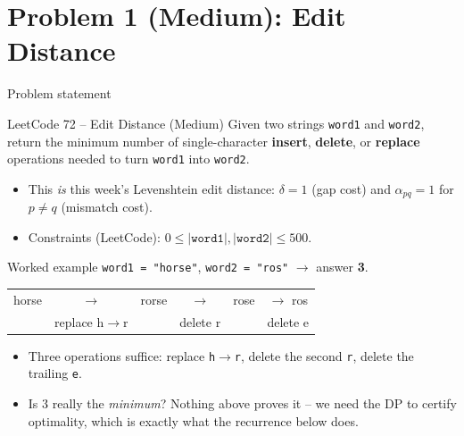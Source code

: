\documentclass[11pt,aspectratio=169]{beamer}
\begin{document}
\section{Problem 1 (Medium): Edit Distance}

\begin{frame}{Problem statement}
  \begin{block}{LeetCode 72 -- Edit Distance (\textcolor{blue!50!black}{Medium})}
    Given two strings \texttt{word1} and \texttt{word2}, return the minimum number of
    single-character \textbf{insert}, \textbf{delete}, or \textbf{replace} operations
    needed to turn \texttt{word1} into \texttt{word2}.
  \end{block}
  \begin{itemize}
    \item This \emph{is} this week's Levenshtein edit distance: $\delta = 1$ (gap cost)
    and $\alpha_{pq} = 1$ for $p \ne q$ (mismatch cost).
    \item Constraints (LeetCode): $0 \le |\texttt{word1}|, |\texttt{word2}| \le 500$.
  \end{itemize}
\end{frame}

\begin{frame}{Worked example}
  \texttt{word1 = "horse"}, \texttt{word2 = "ros"} $\to$ answer \textbf{3}.
  \begin{center}
  \small
  \begin{tabular}{@{}cccccc@{}}
    horse & $\to$ & rorse & $\to$ & rose & $\to$ ros \\
    & \scriptsize replace h$\to$r & & \scriptsize delete r & & \scriptsize delete e \\
  \end{tabular}
  \end{center}
  \begin{itemize}
    \item Three operations suffice: replace \texttt{h}$\to$\texttt{r}, delete the
    second \texttt{r}, delete the trailing \texttt{e}.
    \item Is 3 really the \emph{minimum}? Nothing above proves it -- we need the DP to
    certify optimality, which is exactly what the recurrence below does.
  \end{itemize}
\end{frame}
\end{document}
